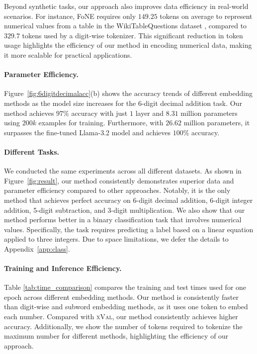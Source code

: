 Beyond synthetic tasks, our approach also improves data efficiency in real-world scenarios. For instance, FoNE requires only $149.25$ tokens on average to represent numerical values from a table in the WikiTableQuestions dataset \citep{pasupat-liang-2015-compositional}, compared to $329.7$ tokens used by a digit-wise tokenizer. This significant reduction in token usage highlights the efficiency of our method in encoding numerical data, making it more scalable for practical applications.

\paragraph{Parameter Efficiency.}
Figure~\ref{fig:6digitdecimalacc}(b) shows the accuracy trends of different embedding methods as the model size increases for the 6-digit decimal addition task. Our method achieves \(97\%\) accuracy with just \(1\) layer and \(8.31\) million parameters using $200k$ examples for training. Furthermore, with \(26.62\) million parameters, it surpasses the fine-tuned Llama-3.2 model and achieves \(100\%\) accuracy.

\paragraph{Different Tasks.} We conducted the same experiments across all different datasets. As shown in Figure~\ref{fig:result}, our method consistently demonstrates superior data and parameter efficiency compared to other approaches. Notably, it is the only method that achieves perfect accuracy on 6-digit decimal addition, 6-digit integer addition, 5-digit subtraction, and 3-digit multiplication. We also show that our method performs better in a binary classification task that involves numerical values. Specifically, the task requires predicting a label based on a linear equation applied to three integers. Due to space limitations, we defer the details to Appendix~\ref{app:class}.


\paragraph{Training and Inference Efficiency.}
Table \ref{tab:time_comparison} compares the training and test times used for one epoch across different embedding methods. Our method is consistently faster than digit-wise and subword embedding methods, as it uses one token to embed each number. Compared with \textsc{xVal}, our method consistently achieves higher accuracy. Additionally, we show the number of tokens required to tokenize the maximum number for different methods, highlighting the efficiency of our approach.


